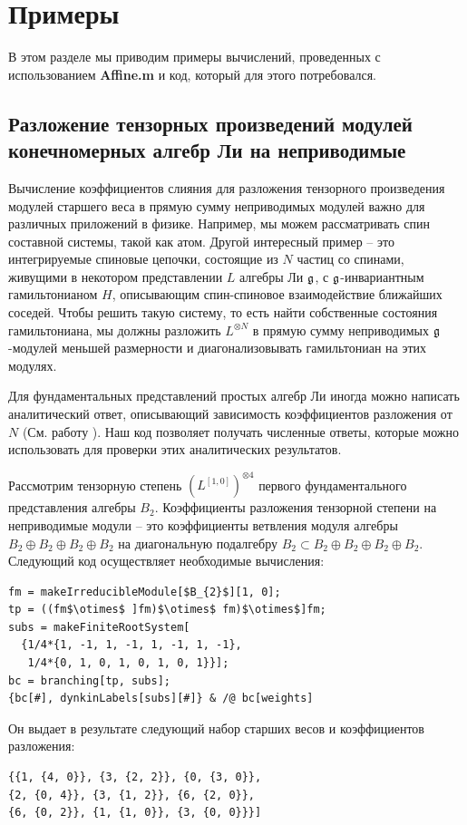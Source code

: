 \section{Примеры}
\label{sec:examples-six}
В этом разделе мы приводим примеры вычислений, проведенных с использованием {\bf Affine.m} и код, который для этого потребовался.

\subsection{Разложение тензорных произведений модулей конечномерных алгебр Ли на неприводимые}
\label{sec:tens-prod-decomp}

Вычисление коэффициентов слияния для разложения тензорного произведения модулей старшего веса в прямую сумму неприводимых модулей важно для различных приложений в физике. Например, мы можем рассматривать спин составной системы, такой как атом. Другой интересный пример -- это интегрируемые спиновые цепочки, состоящие из  $N$ частиц со спинами, живущими в некотором представлении  $L$ алгебры Ли $\mathfrak{g}$, с  $\mathfrak{g}$-инвариантным гамильтонианом $H$, описывающим спин-спиновое взаимодействие ближайших соседей. Чтобы решить такую систему, то есть найти собственные состояния гамильтониана, мы должны разложить  $L^{\otimes N}$ в прямую сумму неприводимых $\mathfrak{g}$-модулей меньшей размерности и диагонализовывать гамильтониан на этих модулях.

Для фундаментальных представлений простых алгебр Ли иногда можно написать аналитический ответ, описывающий зависимость коэффициентов разложения от  $N$ (См. работу \cite{LyakhovskyPostnova2011}). Наш код позволяет получать численные ответы, которые можно использовать для проверки этих аналитических результатов.

Рассмотрим тензорную степень $\left(L^{[1,0]}\right)^{\otimes 4}$ первого фундаментального представления алгебры $B_{2}$. Коэффициенты разложения тензорной степени на неприводимые модули -- это коэффициенты ветвления модуля алгебры $B_{2}\oplus B_{2}\oplus B_{2}\oplus B_{2}$ на диагональную подалгебру $B_{2}\subset B_{2}\oplus B_{2}\oplus B_{2}\oplus B_{2}$. Следующий код осуществляет необходимые вычисления:
\begin{lstlisting}[mathescape=true]
fm = makeIrreducibleModule[$B_{2}$][1, 0];
tp = ((fm$\otimes$ ]fm)$\otimes$ fm)$\otimes$]fm;
subs = makeFiniteRootSystem[
  {1/4*{1, -1, 1, -1, 1, -1, 1, -1}, 
   1/4*{0, 1, 0, 1, 0, 1, 0, 1}}];
bc = branching[tp, subs];
{bc[#], dynkinLabels[subs][#]} & /@ bc[weights]
\end{lstlisting}
Он выдает в результате следующий набор старших весов и коэффициентов разложения:
\begin{lstlisting}
{{1, {4, 0}}, {3, {2, 2}}, {0, {3, 0}}, 
{2, {0, 4}}, {3, {1, 2}}, {6, {2, 0}}, 
{6, {0, 2}}, {1, {1, 0}}, {3, {0, 0}}}]
\end{lstlisting}

